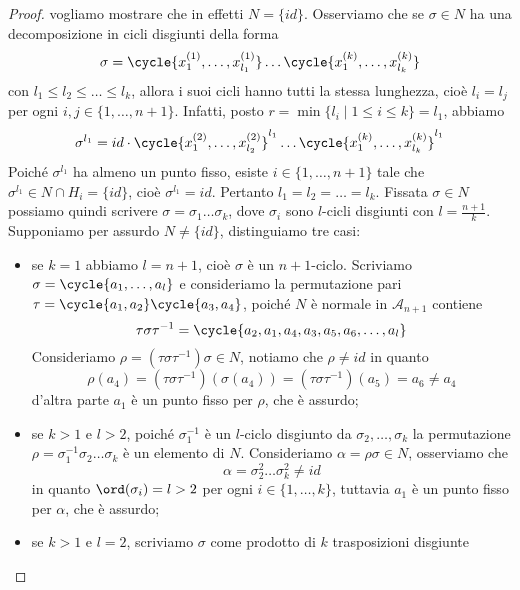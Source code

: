 \documentclass[11pt]{scrartcl}
\begin{document}
\begin{proof}
    vogliamo mostrare che in effetti $N = \{id\}$. Osserviamo che se
    $\sigma \in N$ ha una decomposizione in cicli disgiunti
    della forma
    \[
        \sigma = \cycle{x_1^{(1)}, \ldots, x_{l_1}^{(1)}}\ldots\cycle{x_1^{(k)}, \ldots, x_{l_k}^{(k)}}
    \]
    con $l_1\leqslant l_2\leqslant \ldots\leqslant l_k$, allora i suoi cicli 
    hanno tutti la stessa lunghezza, cioè $l_i = l_j$ per ogni $i, j \in \{1, \ldots, n + 1\}$.
    Infatti, posto $r = \min\{l_i\mid 1\leqslant i \leqslant k\} = l_1$, 
    abbiamo
    \[
        \sigma^{l_1} = id \cdot \cycle{x_1^{(2)}, \ldots, x_{l_2}^{(2)}}^{l_1}
        \ldots\cycle{x_1^{(k)}, \ldots, x_{l_k}^{(k)}}^{l_1}
    \]
    Poiché $\sigma^{l_1}$ ha almeno un punto fisso, esiste $i \in \{1, \ldots, n + 1\}$
    tale che $\sigma^{l_1} \in N\cap H_i = \{id\}$, cioè $\sigma^{l_1} = id$. Pertanto 
    $l_1 = l_2 = \ldots = l_k$. Fissata $\sigma \in N$ possiamo quindi scrivere
    $\sigma = \sigma_1\ldots\sigma_k$,
    dove $\sigma_i$ sono $l$-cicli disgiunti con $l = \displaystyle\frac{n + 1}{k}$.
    Supponiamo per assurdo $N \neq \{id\}$, distinguiamo tre casi:
    \begin{itemize}
        \item se $k = 1$ abbiamo $l = n + 1$, cioè $\sigma$ è un $n + 1$-ciclo.
        Scriviamo $\sigma = \cycle{a_1, \ldots, a_l}$ e consideriamo la permutazione
        pari $\tau = \cycle{a_1, a_2}\cycle{a_3, a_4}$, poiché $N$ è normale in 
        $\mathcal{A}_{n + 1}$ contiene
        \[
            \tau\sigma\tau^{-1} = \cycle{a_2, a_1, a_4, a_3, a_5, a_6, \ldots, a_l}
        \]
        Consideriamo $\rho = (\tau\sigma\tau^{-1})\sigma \in N$, notiamo che
        $\rho \neq id$ in quanto
        \[
            \rho(a_4) = (\tau\sigma\tau^{-1})(\sigma(a_4)) = (\tau\sigma\tau^{-1})(a_5) = 
            a_6 \neq a_4
        \]
        d'altra parte $a_1$ è un punto fisso per $\rho$, che è assurdo;
        \item se $k > 1$ e $l > 2$, poiché $\sigma_1^{-1}$ è un $l$-ciclo
        disgiunto da $\sigma_2, \ldots, \sigma_k$ la permutazione 
        $\rho = \sigma_1^{-1}\sigma_2\ldots\sigma_k$ è un elemento di $N$. 
        Consideriamo $\alpha = \rho\sigma \in N$, osserviamo che 
        \[
            \alpha = \sigma_2^2\ldots\sigma_k^2 \neq id
        \]
        in quanto $\ord(\sigma_i) = l > 2$ per ogni $i \in \{1, \ldots, k\}$,
        tuttavia $a_1$ è un punto fisso per $\alpha$, che è assurdo;
        \item se $k > 1$ e $l = 2$, scriviamo $\sigma$ come prodotto di $k$
        trasposizioni disgiunte

\end{itemize}
\end{proof}
\end{document}

